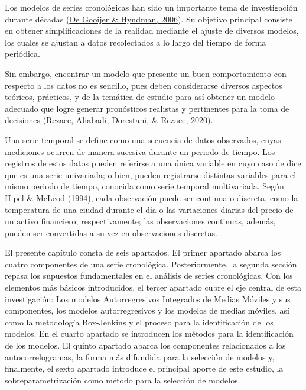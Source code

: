 \documentclass[
]{article}
\begin{document}
Los modelos de series cronológicas han sido un importante tema de
investigación durante décadas (\protect\hyperlink{ref-tsa_decades}{De
Gooijer \& Hyndman, 2006}). Su objetivo principal consiste en obtener
simplificaciones de la realidad mediante el ajuste de diversos modelos,
los cuales se ajustan a datos recolectados a lo largo del tiempo de
forma periódica.

Sin embargo, encontrar un modelo que presente un buen comportamiento con
respecto a los datos no es sencillo, pues deben considerarse diversos
aspectos teóricos, prácticos, y de la temática de estudio para así
obtener un modelo adecuado que logre generar pronósticos realistas y
pertinentes para la toma de decisiones
(\protect\hyperlink{ref-tsa_decision_making}{Rezaee, Aliabadi,
Dorestani, \& Rezaee, 2020}).

Una serie temporal se define como una secuencia de datos observados,
cuyas mediciones ocurren de manera sucesiva durante un periodo de
tiempo. Los registros de estos datos pueden referirse a una única
variable en cuyo caso de dice que es una serie univariada; o bien,
pueden registrarse distintas variables para el mismo periodo de tiempo,
conocida como serie temporal multivariada. Según
\protect\hyperlink{ref-Hipel}{Hipel \& McLeod}
(\protect\hyperlink{ref-Hipel}{1994}), cada observación puede ser
continua o discreta, como la temperatura de una ciudad durante el día o
las variaciones diarias del precio de un activo financiero,
respectivamente; las observaciones continuas, además, pueden ser
convertidas a su vez en observaciones discretas.

El presente capítulo consta de seis apartados. El primer apartado abarca
los cuatro componentes de una serie cronológica. Posteriormente, la
segunda sección repasa los supuestos fundamentales en el análisis de
series cronológicas. Con los elementos más básicos introducidos, el
tercer apartado cubre el eje central de esta investigación: Los modelos
Autorregresivos Integrados de Medias Móviles y sus componentes, los
modelos autorregresivos y los modelos de medias móviles, así como la
metodología Box-Jenkins y el proceso para la identificación de los
modelos. En el cuarto apartado se introducen los métodos para la
identificación de los modelos. El quinto apartado abarca los componentes
relacionados a los autocorrelogramas, la forma más difundida para la
selección de modelos y, finalmente, el sexto apartado introduce el
principal aporte de este estudio, la sobreparametrización como método
para la selección de modelos.
\end{document}
